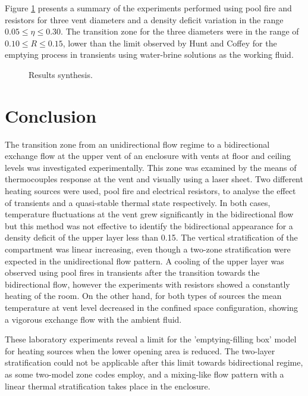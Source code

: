 \documentclass[preprint,12pt]{elsarticle}
\begin{document}
Figure \ref{fig:syn} presents a summary of the experiments performed using pool fire and resistors for three vent diameters and a density deficit variation in the range \(0.05\leqslant \eta \leqslant 0.30\). The transition zone for the three diameters were in the range of \(0.10 \leqslant R \leqslant 0.15\), lower than the limit observed by Hunt and Coffey \cite{hunt_coffey_2010} for the emptying process in transients using water-brine solutions as the working fluid.

\begin{figure}[h]
\centering
\resizebox{0.55\textwidth}{!}{}
\caption{Results synthesis.}
\label{fig:syn}
\end{figure}

\section{Conclusion}
\label{sec:orge939ea3}
The transition zone from an unidirectional flow regime to a bidirectional exchange flow at the upper vent of an enclosure with vents at floor and ceiling levels was investigated experimentally. This zone was examined by the means of thermocouples response at the vent and visually using a laser sheet. Two different heating sources were used, pool fire and electrical resistors, to analyse the effect of transients and a quasi-stable thermal state respectively. In both cases, temperature fluctuations at the vent grew significantly in the bidirectional flow but this method was not effective to identify the bidirectional appearance for a density deficit of the upper layer less than 0.15. The vertical stratification of the compartment was linear increasing, even though a two-zone stratification were expected in the unidirectional flow pattern. A cooling of the upper layer was observed using pool fires in transients after the transition towards the bidirectional flow, however the experiments with resistors showed a constantly heating of the room. On the other hand, for both types of sources the mean temperature at vent level decreased in the confined space configuration, showing a vigorous exchange flow with the ambient fluid.

These laboratory experiments reveal a limit for the 'emptying-filling box' model for heating sources when the lower opening area is reduced. The two-layer stratification could not be applicable after this limit towards bidirectional regime, as some two-model zone codes employ, and a mixing-like flow pattern with a linear thermal stratification takes place in the enclosure.





\end{document}
